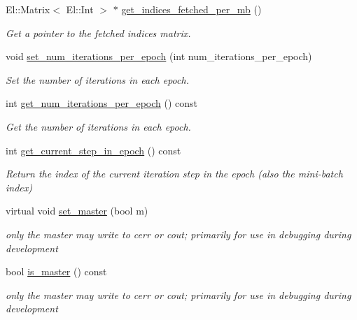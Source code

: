 \begin{DoxyCompactItemize}
El\+::\+Matrix$<$ El\+::\+Int $>$ $\ast$ \hyperlink{classlbann_1_1generic__data__reader_a8d8b44ed55e2af49c70d29277ff57a91}{get\+\_\+indices\+\_\+fetched\+\_\+per\+\_\+mb} ()
\begin{DoxyCompactList}\small\item\em Get a pointer to the fetched indices matrix. \end{DoxyCompactList}\item 
void \hyperlink{classlbann_1_1generic__data__reader_a91573d9599b503a6bdf2939e69659e8b}{set\+\_\+num\+\_\+iterations\+\_\+per\+\_\+epoch} (int num\+\_\+iterations\+\_\+per\+\_\+epoch)
\begin{DoxyCompactList}\small\item\em Set the number of iterations in each epoch. \end{DoxyCompactList}\item 
int \hyperlink{classlbann_1_1generic__data__reader_a06fb58d1c0b84b8c76f5b4d160751f34}{get\+\_\+num\+\_\+iterations\+\_\+per\+\_\+epoch} () const
\begin{DoxyCompactList}\small\item\em Get the number of iterations in each epoch. \end{DoxyCompactList}\item 
int \hyperlink{classlbann_1_1generic__data__reader_a7c884d3646396a05d9e01e3b7a260419}{get\+\_\+current\+\_\+step\+\_\+in\+\_\+epoch} () const
\begin{DoxyCompactList}\small\item\em Return the index of the current iteration step in the epoch (also the mini-\/batch index) \end{DoxyCompactList}\item 
virtual void \hyperlink{classlbann_1_1generic__data__reader_a343f7d791a04aa1ef30ff829a899e2ae}{set\+\_\+master} (bool m)
\begin{DoxyCompactList}\small\item\em only the master may write to cerr or cout; primarily for use in debugging during development \end{DoxyCompactList}\item 
bool \hyperlink{classlbann_1_1generic__data__reader_ae82c40eebc05e2f0c1198afcc7a7f009}{is\+\_\+master} () const
\begin{DoxyCompactList}\small\item\em only the master may write to cerr or cout; primarily for use in debugging during development \end{DoxyCompactList}\item 

\end{DoxyCompactItemize}
